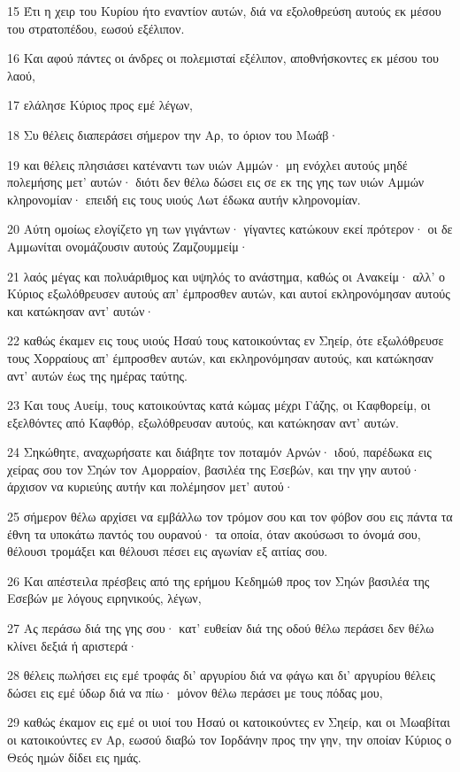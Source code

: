 \par 15 Έτι η χειρ του Κυρίου ήτο εναντίον αυτών, διά να εξολοθρεύση αυτούς εκ μέσου του στρατοπέδου, εωσού εξέλιπον.
\par 16 Και αφού πάντες οι άνδρες οι πολεμισταί εξέλιπον, αποθνήσκοντες εκ μέσου του λαού,
\par 17 ελάλησε Κύριος προς εμέ λέγων,
\par 18 Συ θέλεις διαπεράσει σήμερον την Αρ, το όριον του Μωάβ·
\par 19 και θέλεις πλησιάσει κατέναντι των υιών Αμμών· μη ενόχλει αυτούς μηδέ πολεμήσης μετ' αυτών· διότι δεν θέλω δώσει εις σε εκ της γης των υιών Αμμών κληρονομίαν· επειδή εις τους υιούς Λωτ έδωκα αυτήν κληρονομίαν.
\par 20 Αύτη ομοίως ελογίζετο γη των γιγάντων· γίγαντες κατώκουν εκεί πρότερον· οι δε Αμμωνίται ονομάζουσιν αυτούς Ζαμζουμμείμ·
\par 21 λαός μέγας και πολυάριθμος και υψηλός το ανάστημα, καθώς οι Ανακείμ· αλλ' ο Κύριος εξωλόθρευσεν αυτούς απ' έμπροσθεν αυτών, και αυτοί εκληρονόμησαν αυτούς και κατώκησαν αντ' αυτών·
\par 22 καθώς έκαμεν εις τους υιούς Ησαύ τους κατοικούντας εν Σηείρ, ότε εξωλόθρευσε τους Χορραίους απ' έμπροσθεν αυτών, και εκληρονόμησαν αυτούς, και κατώκησαν αντ' αυτών έως της ημέρας ταύτης.
\par 23 Και τους Αυείμ, τους κατοικούντας κατά κώμας μέχρι Γάζης, οι Καφθορείμ, οι εξελθόντες από Καφθόρ, εξωλόθρευσαν αυτούς, και κατώκησαν αντ' αυτών.
\par 24 Σηκώθητε, αναχωρήσατε και διάβητε τον ποταμόν Αρνών· ιδού, παρέδωκα εις χείρας σου τον Σηών τον Αμορραίον, βασιλέα της Εσεβών, και την γην αυτού· άρχισον να κυριεύης αυτήν και πολέμησον μετ' αυτού·
\par 25 σήμερον θέλω αρχίσει να εμβάλλω τον τρόμον σου και τον φόβον σου εις πάντα τα έθνη τα υποκάτω παντός του ουρανού· τα οποία, όταν ακούσωσι το όνομά σου, θέλουσι τρομάξει και θέλουσι πέσει εις αγωνίαν εξ αιτίας σου.
\par 26 Και απέστειλα πρέσβεις από της ερήμου Κεδημώθ προς τον Σηών βασιλέα της Εσεβών με λόγους ειρηνικούς, λέγων,
\par 27 Ας περάσω διά της γης σου· κατ' ευθείαν διά της οδού θέλω περάσει δεν θέλω κλίνει δεξιά ή αριστερά·
\par 28 θέλεις πωλήσει εις εμέ τροφάς δι' αργυρίου διά να φάγω και δι' αργυρίου θέλεις δώσει εις εμέ ύδωρ διά να πίω· μόνον θέλω περάσει με τους πόδας μου,
\par 29 καθώς έκαμον εις εμέ οι υιοί του Ησαύ οι κατοικούντες εν Σηείρ, και οι Μωαβίται οι κατοικούντες εν Αρ, εωσού διαβώ τον Ιορδάνην προς την γην, την οποίαν Κύριος ο Θεός ημών δίδει εις ημάς.
